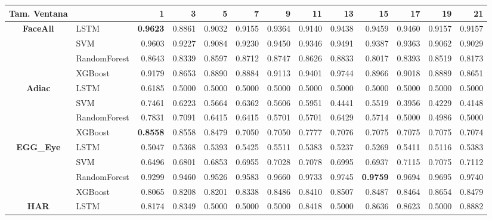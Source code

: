 \begin{table}[h]
\centering
\begin{adjustbox}{max width=15cm}
\begin{tabular}{|c|l|r|r|r|r|r|r|r|r|r|r|r|}
		\hline
		\textbf{Tam. Ventana}&         &      1  &      3  &      5  &      7  &      9  &      11 &      13 &      15 &      17 &      19 &      21 \\
		\hline
		\textbf{FaceAll} & LSTM &  \textbf{0.9623} &  0.8861 &  0.9032 &  0.9155 &  0.9364 &  0.9140 &  0.9438 &  0.9459 &  0.9460 &  0.9157 &  0.9157 \\
		& SVM &  0.9603 &  0.9227 &  0.9084 &  0.9230 &  0.9450 &  0.9346 &  0.9491 &  0.9387 &  0.9363 &  0.9062 &  0.9029 \\
		& RandomForest &  0.8643 &  0.8339 &  0.8597 &  0.8712 &  0.8747 &  0.8626 &  0.8833 &  0.8017 &  0.8393 &  0.8519 &  0.8173 \\
		& XGBoost &  0.9179 &  0.8653 &  0.8890 &  0.8884 &  0.9113 &  0.9401 &  0.9744 &  0.8966 &  0.9018 &  0.8889 &  0.8651 \\
		\hline
		\textbf{Adiac} & LSTM &  0.6185 &  0.5000 &  0.5000 &  0.5000 &  0.5000 &  0.5000 &  0.5000 &  0.5000 &  0.5000 &  0.5000 &  0.5000 \\
		& SVM &  0.7461 &  0.6223 &  0.5664 &  0.6362 &  0.5606 &  0.5951 &  0.4441 &  0.5519 &  0.3956 &  0.4229 &  0.4148 \\
		& RandomForest &  0.7831 &  0.7091 &  0.6415 &  0.6415 &  0.5701 &  0.5701 &  0.6429 &  0.5714 &  0.5000 &  0.4986 &  0.5000 \\
		& XGBoost &  \textbf{0.8558} &  0.8558 &  0.8479 &  0.7050 &  0.7050 &  0.7777 &  0.7076 &  0.7075 &  0.7075 &  0.7075 &  0.7074 \\
		\hline
		\textbf{EGG\_Eye} & LSTM &  0.5047 &  0.5368 &  0.5393 &  0.5425 &  0.5511 &  0.5383 &  0.5237 &  0.5269 &  0.5411 &  0.5116 &  0.5383 \\
		& SVM &  0.6496 &  0.6801 &  0.6853 &  0.6955 &  0.7028 &  0.7078 &  0.6995 &  0.6937 &  0.7115 &  0.7075 &  0.7112 \\
		& RandomForest &  0.9299 &  0.9460 &  0.9526 &  0.9583 &  0.9660 &  0.9733 &  0.9745 &  \textbf{0.9759} &  0.9694 &  0.9695 &  0.9740 \\
		& XGBoost &  0.8065 &  0.8208 &  0.8201 &  0.8338 &  0.8486 &  0.8410 &  0.8507 &  0.8487 &  0.8464 &  0.8654 &  0.8479 \\
		\hline
		\textbf{HAR} & LSTM &  0.8174 &  0.8349 &  0.5000 &  0.5000 &  0.5000 &  0.8418 &  0.5000 &  0.8636 &  0.8623 &  0.5000 &  0.8882 \\

\end{tabular}
\end{adjustbox}
\end{table}
